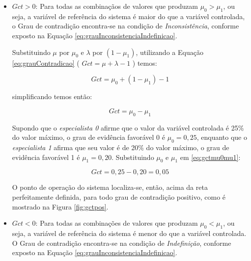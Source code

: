 \begin{itemize}
\item $Gct > 0 $: 
Para todas as combinaçãos de valores que produzam 
$\mu_0 > \mu_1$, 
ou seja, a variável de referência do sistema é 
maior do que a variável controlada,
o Grau de contradição encontra-se na condição de 
\textit{Inconsistência}, conforme exposto na Equação 
\ref{eq:grauInconsistenciaIndefinicao}.

Substituindo $\mu$ por $\mu_0$ e 
$\lambda$ por $(1-\mu_1)$, 
utilizando a Equação \ref{eq:grauContradicao} 
( $Gct = \mu + \lambda - 1 $ )
temos:



\begin{equation}%
Gct = \mu_0 + (1-\mu_1) -1
\end{equation}%



simplificando temos então:



\begin{equation}%
Gct = \mu_0 - \mu_1
\label{eq:gctmu0mu1}
\end{equation}%



Supondo que o \emph{especialista 0} afirme que 
o valor da variável controlada é 25\% do valor máximo, 
o grau de evidência favorável 0 é $\mu_0 = 0,25$, 
enquanto que o \emph{especialista 1} afirma que 
seu valor é de 20\% do valor máximo, 
o grau de evidência favorável 1 é $\mu_1 = 0,20$. 
Substituindo $\mu_0$ e $\mu_1$ em \ref{eq:gctmu0mu1}:



\begin{equation}%
Gct = 0,25 - 0,20 = 0,05
\end{equation}%



O ponto de operação do sistema 
localiza-se, então, acima da reta perfeitamente definida,
para todo grau de contradição positivo, 
como é mostrado na Figura \ref{fig:gctpos}.



\item $Gct < 0 $: 
Para todas as combinações de valores que produzam 
$\mu_0 < \mu_1$, 
ou seja, a variável de referência do sistema é 
menor do que a variável controlada. 
O Grau de contradição encontra-se na condição de 
\textit{Indefinição}, conforme exposto na Equação 
\ref{eq:grauInconsistenciaIndefinicao}.


\end{itemize}
